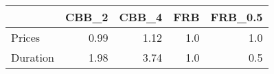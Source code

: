 \begin{tabular}{lrrrr}
\toprule
{} &  CBB\_2 &  CBB\_4 &  FRB &  FRB\_0.5 \\
\midrule
Prices   &   0.99 &   1.12 &  1.0 &      1.0 \\
Duration &   1.98 &   3.74 &  1.0 &      0.5 \\
\bottomrule
\end{tabular}
